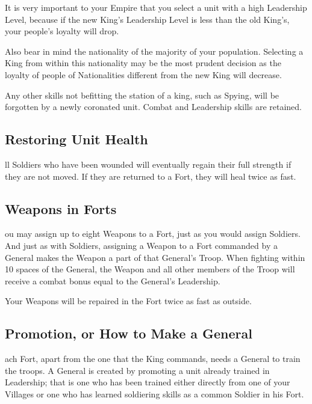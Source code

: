 It is very important to your Empire that you select a unit with a high Leadership Level, because if the new King’s Leadership Level is less than the old King’s, your people’s loyalty will drop.

Also bear in mind the nationality of the majority of your population. Selecting a King from within this nationality may be the most prudent decision as the loyalty of people of Nationalities different from the new King will decrease.

Any other skills not befitting the station of a king, such as Spying, will be forgotten by a newly coronated unit. Combat and Leadership skills are retained.

\subsection{\textsf{Restoring Unit Health}}


ll Soldiers who have been wounded will eventually regain their full strength if they are not moved. If they are returned to a Fort, they will heal twice as fast.

\subsection{\textsf{Weapons in Forts}}



ou may assign up to eight Weapons to a Fort, just as you would assign Soldiers. And just as with Soldiers, assigning a Weapon to a Fort commanded by a General makes the Weapon a part of that General’s Troop. When fighting within 10 spaces of the General, the Weapon and all other members of the Troop will receive a combat bonus equal to the General’s Leadership.

Your Weapons will be repaired in the Fort twice as fast as outside.

\subsection{\textsf{Promotion, or How to Make a General}}


ach Fort, apart from the one that the King commands, needs a General to train the troops. A General is created by promoting a unit already trained in Leadership; that is one who has been trained either directly from one of your Villages or one who has learned soldiering skills as a common Soldier in his Fort.


